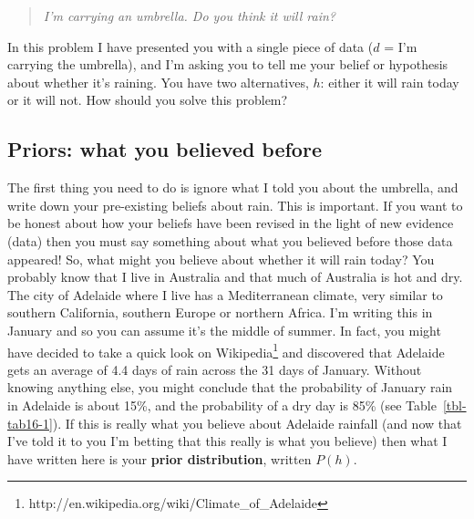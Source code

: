\documentclass[
  a4paper,
]{book}
\begin{document}
\begin{quote}
\emph{I'm carrying an umbrella. Do you think it will rain?}
\end{quote}

In this problem I have presented you with a single piece of data (\(d\)
= I'm carrying the umbrella), and I'm asking you to tell me your belief
or hypothesis about whether it's raining. You have two alternatives,
\(h\): either it will rain today or it will not. How should you solve
this problem?

\hypertarget{priors-what-you-believed-before}{%
\subsection{Priors: what you believed
before}\label{priors-what-you-believed-before}}

The first thing you need to do is ignore what I told you about the
umbrella, and write down your pre-existing beliefs about rain. This is
important. If you want to be honest about how your beliefs have been
revised in the light of new evidence (data) then you must say something
about what you believed before those data appeared! So, what might you
believe about whether it will rain today? You probably know that I live
in Australia and that much of Australia is hot and dry. The city of
Adelaide where I live has a Mediterranean climate, very similar to
southern California, southern Europe or northern Africa. I'm writing
this in January and so you can assume it's the middle of summer. In
fact, you might have decided to take a quick look on
Wikipedia\footnote{http://en.wikipedia.org/wiki/Climate\_of\_Adelaide}
and discovered that Adelaide gets an average of 4.4 days of rain across
the 31 days of January. Without knowing anything else, you might
conclude that the probability of January rain in Adelaide is about 15\%,
and the probability of a dry day is 85\% (see Table~\ref{tbl-tab16-1}).
If this is really what you believe about Adelaide rainfall (and now that
I've told it to you I'm betting that this really is what you believe)
then what I have written here is your \textbf{prior distribution},
written \(P(h)\).

\hypertarget{tbl-tab16-1}{}
 
  \providecommand{\huxb}[2]{\arrayrulecolor[RGB]{#1}\global\arrayrulewidth=#2pt}
  \providecommand{\huxvb}[2]{\color[RGB]{#1}\vrule width #2pt}
  \providecommand{\huxtpad}[1]{\rule{0pt}{#1}}
  \providecommand{\huxbpad}[1]{\rule[-#1]{0pt}{#1}}
\end{document}
